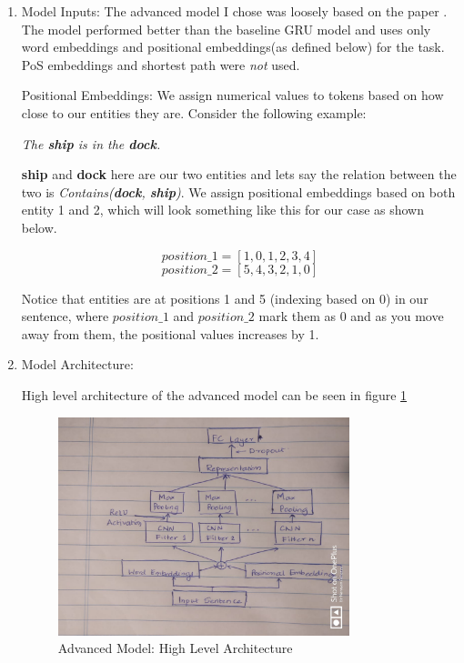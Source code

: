\documentclass[11pt]{article}
\begin{document}
\begin{enumerate}
\item Model Inputs:
The advanced model I chose was loosely based on the paper \cite{CNN}.
The model performed better than the baseline GRU model and uses only word embeddings and positional embeddings(as defined below) for the task. PoS embeddings and shortest path were \textit{not} used.

Positional Embeddings: We assign numerical values to tokens based on how close to our entities they are. Consider the following example:

\begin{center}
	\textit{The \textbf{ship} is in the \textbf{dock}.}
\end{center}

\textbf{ship} and \textbf{dock} here are our two entities and lets say the relation between the two is \textit{Contains(\textbf{dock}, \textbf{ship})}. We assign positional embeddings based on both entity 1 and 2, which will look something like this for our case as shown below.

\begin{equation*}
position\_1 = [1, 0, 1, 2, 3, 4]
\end{equation*}
\begin{equation*}
position\_2 = [5, 4, 3, 2, 1, 0]
\end{equation*}

Notice that entities are at positions 1 and 5 (indexing based on 0) in our sentence, where $ position\_1 $ and $ position\_2 $ mark them as 0 and as you move away from them, the positional values increases by 1.

\item Model Architecture:

High level architecture of the advanced model can be seen in figure \ref{fig:advanced-model}
\begin{figure}[!ht]
	\centering
	\includegraphics[width=0.8\textwidth]{advanced-model.jpeg}
	\caption{Advanced Model: High Level Architecture}
	\label{fig:advanced-model}
\end{figure}


\end{enumerate}
\end{document}
